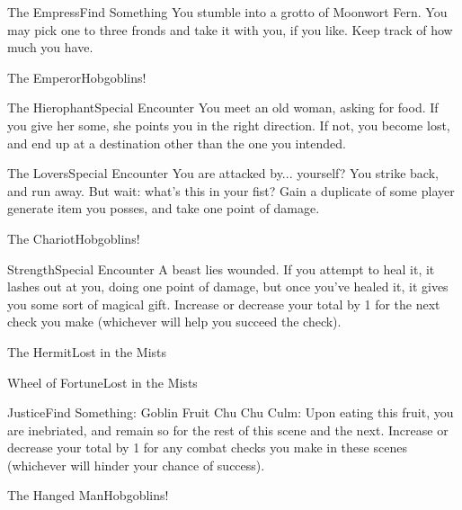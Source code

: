 \documentclass[white]{gl2018}
\begin{document}
\begin{location}{The Empress}{Find Something}
You stumble into a grotto of Moonwort Fern.  You may pick one to three fronds and take it with you, if you like.  Keep track of how much you have.
\end{location}
\begin{location}{The Emperor}{Hobgoblins!}
\end{location}
\begin{location}{The Hierophant}{Special Encounter}
You meet an old woman, asking for food.  If you give her some, she points you in the right direction.  If not, you become lost, and end up at a destination other than the one you intended.
\end{location}
\begin{location}{The Lovers}{Special Encounter}
You are attacked by... yourself? You strike back, and run away. But wait: what's this in your fist? Gain a duplicate of some player generate item you posses, and take one point of damage.
\end{location}
\begin{location}{The Chariot}{Hobgoblins!}
\end{location}
\begin{location}{Strength}{Special Encounter}
A beast lies wounded.  If you attempt to heal it, it lashes out at you, doing one point of damage, but once you've healed it, it gives you some sort of magical gift. Increase or decrease your total by 1 for the next check you make (whichever will help you succeed the check). 
\end{location}
\begin{location}{The Hermit}{Lost in the Mists}
\end{location}
\begin{location}{Wheel of Fortune}{Lost in the Mists}
\end{location}
\begin{location}{Justice}{Find Something: Goblin Fruit}
Chu Chu Culm: Upon eating this fruit, you are inebriated, and remain so for the rest of this scene and the next.  Increase or decrease your total by 1 for any combat checks you make in these scenes (whichever will hinder your chance of success).
\end{location}
\begin{location}{The Hanged Man}{Hobgoblins!}
\end{location}
\end{document}
